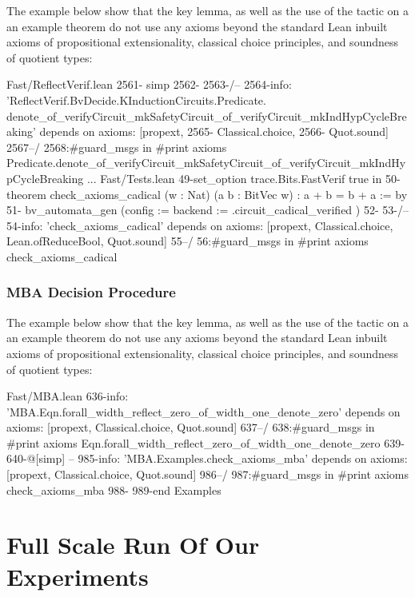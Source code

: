 \documentclass[acmlarge, nonacm]{acmart}
\begin{document}
The example below show that the key lemma,
as well as the use of the tactic on a an example theorem
do not use any axioms beyond the standard Lean inbuilt
axioms of propositional extensionality, classical choice principles, and soundness of quotient types:

\begin{script}
Fast/ReflectVerif.lean
2561-    simp
2562-
2563-/--
2564-info: 'ReflectVerif.BvDecide.KInductionCircuits.Predicate. denote_of_verifyCircuit_mkSafetyCircuit_of_verifyCircuit_mkIndHypCycleBreaking' depends on axioms: [propext,
2565- Classical.choice,
2566- Quot.sound]
2567--/
2568:#guard_msgs in #print axioms Predicate.denote_of_verifyCircuit_mkSafetyCircuit_of_verifyCircuit_mkIndHypCycleBreaking
...
Fast/Tests.lean
49-set_option trace.Bits.FastVerif true in
50-theorem check_axioms_cadical (w : Nat) (a b : BitVec w) : a + b = b + a := by
51-  bv_automata_gen (config := {backend := .circuit_cadical_verified} )
52-
53-/--
54-info: 'check_axioms_cadical' depends on axioms: [propext, Classical.choice, Lean.ofReduceBool, Quot.sound]
55--/
56:#guard_msgs in #print axioms check_axioms_cadical
\end{script}


\subsubsection{MBA Decision Procedure}

The example below show that the key lemma,
as well as the use of the tactic on a an example theorem
do not use any axioms beyond the standard Lean inbuilt
axioms of propositional extensionality, classical choice principles, and soundness of quotient types:


\begin{script}
Fast/MBA.lean
636-info: 'MBA.Eqn.forall_width_reflect_zero_of_width_one_denote_zero' depends on axioms: [propext, Classical.choice, Quot.sound]
637--/
638:#guard_msgs in #print axioms Eqn.forall_width_reflect_zero_of_width_one_denote_zero
639-
640-@[simp]
--
985-info: 'MBA.Examples.check_axioms_mba' depends on axioms: [propext, Classical.choice, Quot.sound]
986--/
987:#guard_msgs in #print axioms check_axioms_mba
988-
989-end Examples
\end{script}



\section{Full Scale Run Of Our Experiments}
\end{document}
